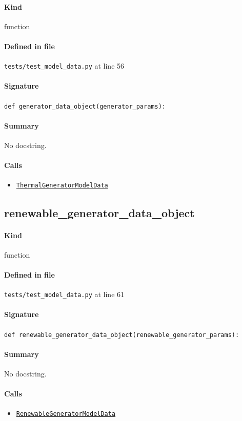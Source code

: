 \documentclass[11pt]{report}
\begin{document}
\paragraph{Kind} function
\paragraph{Defined in file} \texttt{tests/test\_model\_data.py} at line 56
\paragraph{Signature} \texttt{def generator\_data\_object(generator\_params):}
\paragraph{Summary} No docstring.
\paragraph{Calls}
\begin{itemize}[leftmargin=*]
  \item \hyperref[def:model_data.py:ThermalGeneratorModelData:L185]{\texttt{ThermalGeneratorModelData}}
\end{itemize}
\subsection{renewable\_generator\_data\_object}
\label{def:tests-test_model_data.py:renewable_generator_data_object:L61}
\paragraph{Kind} function
\paragraph{Defined in file} \texttt{tests/test\_model\_data.py} at line 61
\paragraph{Signature} \texttt{def renewable\_generator\_data\_object(renewable\_generator\_params):}
\paragraph{Summary} No docstring.
\paragraph{Calls}
\begin{itemize}[leftmargin=*]
  \item \hyperref[def:model_data.py:RenewableGeneratorModelData:L391]{\texttt{RenewableGeneratorModelData}}
\end{itemize}
\end{document}
